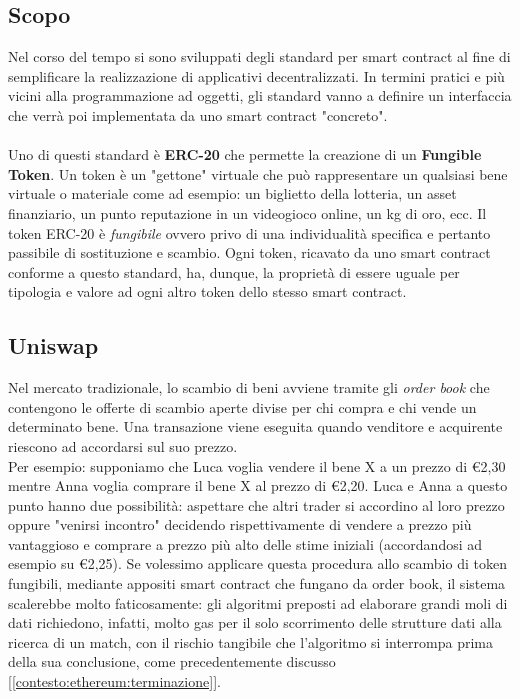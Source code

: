     \subsection{Scopo}
    Nel corso del tempo si sono sviluppati degli standard per smart contract al fine di semplificare la realizzazione di applicativi decentralizzati. In termini pratici e più vicini alla programmazione ad oggetti, gli standard vanno a definire un interfaccia che verrà poi implementata da uno smart contract "concreto".
    \\\\
    Uno di questi standard è \textbf{ERC-20} che permette la creazione di un \textbf{Fungible Token}. Un token è un "gettone" virtuale che può rappresentare un qualsiasi bene virtuale o materiale come ad esempio: un biglietto della lotteria, un asset finanziario, un punto reputazione in un videogioco online, un kg di oro, ecc.
    Il token ERC-20 è \textit{fungibile} ovvero privo di una individualità specifica e pertanto passibile di sostituzione e scambio. Ogni token, ricavato da uno smart contract conforme a questo standard, ha, dunque, la proprietà di essere uguale per tipologia e valore ad ogni altro token dello stesso smart contract.

    \subsection{Uniswap}
    \label{context:ethereum:uniswap}
    Nel mercato tradizionale, lo scambio di beni avviene tramite gli \textit{order book} che contengono le offerte di scambio aperte divise per chi compra e chi vende un determinato bene. Una transazione viene eseguita quando venditore e acquirente riescono ad accordarsi sul suo prezzo.\\
    Per esempio: supponiamo che Luca voglia vendere il bene X a un prezzo di \euro{2,30} mentre Anna voglia comprare il bene X al prezzo di \euro{2,20}. Luca e Anna a questo punto hanno due possibilità: aspettare che altri trader si accordino al loro prezzo oppure "venirsi incontro" decidendo rispettivamente di vendere a prezzo più vantaggioso e comprare a prezzo più alto delle stime iniziali (accordandosi ad esempio su \euro{2,25}).
    Se volessimo applicare questa procedura allo scambio di token fungibili, mediante appositi smart contract che fungano da order book, il sistema scalerebbe molto faticosamente: gli algoritmi preposti ad elaborare grandi moli di dati richiedono, infatti, molto gas per il solo scorrimento delle strutture dati alla ricerca di un match, con il rischio tangibile che l'algoritmo si interrompa prima della sua conclusione, come precedentemente discusso [\autoref{contesto:ethereum:terminazione}].

